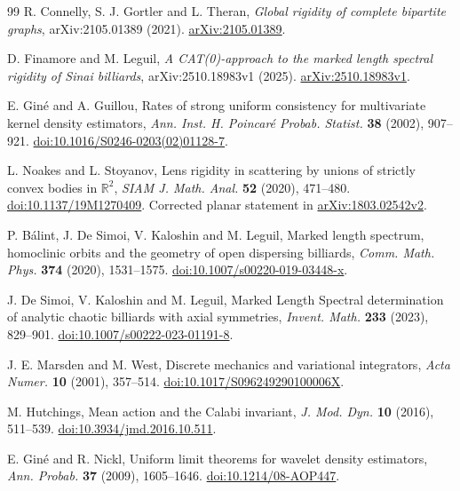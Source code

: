 \begin{thebibliography}{99}
R. Connelly, S. J. Gortler and L. Theran,
\emph{Global rigidity of complete bipartite graphs},
arXiv:2105.01389 (2021).
\href{https://arxiv.org/abs/2105.01389}{arXiv:2105.01389}.

D. Finamore and M. Leguil,
\emph{A CAT(0)-approach to the marked length spectral rigidity of Sinai billiards},
arXiv:2510.18983v1 (2025).
\href{https://arxiv.org/abs/2510.18983v1}{arXiv:2510.18983v1}.

E. Gin\'e and A. Guillou,
Rates of strong uniform consistency for multivariate kernel density
estimators, \emph{Ann. Inst. H. Poincar\'e Probab. Statist.}
\textbf{38} (2002), 907--921.
\href{https://doi.org/10.1016/S0246-0203(02)01128-7}{doi:10.1016/S0246-0203(02)01128-7}.

L. Noakes and L. Stoyanov,
Lens rigidity in scattering by unions of strictly convex bodies in
$\mathbb R^2$, \emph{SIAM J. Math. Anal.} \textbf{52} (2020), 471--480.
\href{https://doi.org/10.1137/19M1270409}{doi:10.1137/19M1270409}.
Corrected planar statement in
\href{https://arxiv.org/abs/1803.02542v2}{arXiv:1803.02542v2}.

P. B\'alint, J. De Simoi, V. Kaloshin and M. Leguil,
Marked length spectrum, homoclinic orbits and the geometry of open
 dispersing billiards, \emph{Comm. Math. Phys.} \textbf{374} (2020),
1531--1575.
\href{https://doi.org/10.1007/s00220-019-03448-x}{doi:10.1007/s00220-019-03448-x}.

J. De Simoi, V. Kaloshin and M. Leguil,
Marked Length Spectral determination of analytic chaotic billiards
with axial symmetries, \emph{Invent. Math.} \textbf{233} (2023), 829--901.
\href{https://doi.org/10.1007/s00222-023-01191-8}{doi:10.1007/s00222-023-01191-8}.

J. E. Marsden and M. West,
Discrete mechanics and variational integrators,
\emph{Acta Numer.} \textbf{10} (2001), 357--514.
\href{https://doi.org/10.1017/S096249290100006X}{doi:10.1017/S096249290100006X}.

M. Hutchings, Mean action and the Calabi invariant,
\emph{J. Mod. Dyn.} \textbf{10} (2016), 511--539.
\href{https://doi.org/10.3934/jmd.2016.10.511}{doi:10.3934/jmd.2016.10.511}.

E. Gin\'e and R. Nickl, Uniform limit theorems for wavelet density
estimators, \emph{Ann. Probab.} \textbf{37} (2009), 1605--1646.
\href{https://doi.org/10.1214/08-AOP447}{doi:10.1214/08-AOP447}.


\end{thebibliography}
